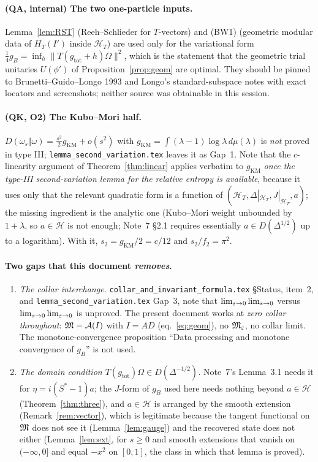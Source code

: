 \documentclass[11pt]{article}
\newcommand{\Om}{\Omega}
\newcommand{\Hil}{\mathcal H}
\newcommand{\norm}[1]{\lVert#1\rVert}
\newcommand{\gB}{g_B}
\newcommand{\gKM}{g_{\mathrm{KM}}}
\newcommand{\HT}{\Hil_T}
\newcommand{\HTR}{H_T}
\newcommand{\gtot}{g_{\mathrm{tot}}}
\begin{document}
\paragraph{(QA, internal) The two one-particle inputs.}
Lemma~\ref{lem:RST} (Reeh--Schlieder for $T$-vectors) and (BW1) (geometric modular data of $\HTR(I')$ inside
$\HT$) are used only for the variational form
$\frac14\gB=\inf_h\norm{T(\gtot+h)\Om}^2$, which is the statement that the geometric trial unitaries
$U(\phi')$ of Proposition~\ref{prop:geom} are optimal.  They should be pinned to
Brunetti--Guido--Longo 1993 and Longo's standard-subspace notes with exact locators and screenshots; neither
source was obtainable in this session.

\paragraph{(QK, O2) The Kubo--Mori half.}
$D(\omega_s\Vert\omega)=\frac{s^2}2\gKM+o(s^2)$ with $\gKM=\int(\lambda-1)\log\lambda\,d\mu(\lambda)$ is
\emph{not} proved in type III; \texttt{lemma\_second\_variation.tex} leaves it as Gap~1.  Note that the
$c$-linearity argument of Theorem~\ref{thm:linear} applies verbatim to $\gKM$ \emph{once the type-III
second-variation lemma for the relative entropy is available}, because it uses only that the relevant
quadratic form is a function of $(\HT,\Delta|_{\HT},J|_{\HT},a)$; the missing ingredient is the analytic
one (Kubo--Mori weight unbounded by $1+\lambda$, so $a\in\Hil$ is not enough; Note~7 \S2.1 requires
essentially $a\in D(\Delta^{1/2})$ up to a logarithm).  With it, $s_2=\gKM/2=c/12$ and $s_2/f_2=\pi^2$.

\paragraph{Two gaps that this document \emph{removes}.}
\begin{enumerate}[leftmargin=1.7em]
\item \emph{The collar interchange.}  \texttt{collar\_and\_invariant\_formula.tex} \S{}Status, item~2, and
 \texttt{lemma\_second\_variation.tex} Gap~3, note that
 $\lim_{\varepsilon\to0}\lim_{s\to0}$ versus $\lim_{s\to0}\lim_{\varepsilon\to0}$ is unproved.  The present document works
 at \emph{zero collar throughout}: $\mathfrak M=\mathcal A(I)$ with $I=AD$ (eq.~\eqref{eq:geom}), no $\mathfrak M_\varepsilon$, no collar limit.  The
 monotone-convergence proposition ``Data processing and monotone convergence of $\gB$'' is not used.
\item \emph{The domain condition $T(\gtot)\Om\in D(\Delta^{-1/2})$.}  Note~7's Lemma~3.1 needs it for
 $\eta=i(S^*-1)a$; the $J$-form of $\gB$ used here needs nothing beyond $a\in\Hil$
 (Theorem~\ref{thm:three}), and $a\in\Hil$ is arranged by the smooth extension
 (Remark~\ref{rem:vector}), which is legitimate because the tangent functional on $\mathfrak M$ does not see it
 (Lemma~\ref{lem:gauge}) and the recovered state does not either (Lemma~\ref{lem:ext}, for $s\ge0$ and smooth extensions that vanish on $(-\infty,0]$ and equal $-x^2$ on $[0,1]$, the class in which that lemma is proved).
\end{enumerate}
\end{document}
